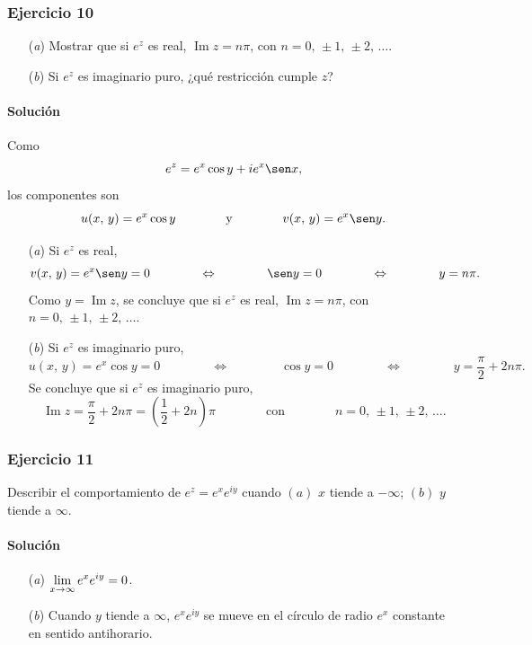 \documentclass[a4paper]{report}
\renewcommand{\Im}{\operatorname{Im}}
\begin{document}
\subsubsection{Ejercicio 10}

\begin{enumerate}
 \item[(\textit{a})] Mostrar que si \(e^z\) es real, \(\Im z=n\pi\), con \(n=0,\,\pm1,\,\pm2,\,\dots\).
 \item[(\textit{b})] Si \(e^z\) es imaginario puro, ¿qué restricción cumple \(z\)?
\end{enumerate}

\paragraph{Solución} Como
\[
 e^{z}=e^x\cos y+ie^x\sen x,
\]
los componentes son
\[
 u(x,\,y)=e^x\cos y
 \qquad\qquad\textrm{y}\qquad\qquad
 v(x,\,y)=e^x\sen y.
\]
\begin{enumerate}
 \item[(\textit{a})] Si \(e^z\) es real,
 \[
  v(x,\,y)=e^x\sen y=0
  \qquad\qquad\Leftrightarrow\qquad\qquad
  \sen y=0
  \qquad\qquad\Leftrightarrow\qquad\qquad
  y=n\pi.
 \]
 Como \(y=\Im z\), se concluye que si \(e^z\) es real, \(\Im z=n\pi\), con \(n=0,\,\pm1,\,\pm2,\,\dots\).
 \item[(\textit{b})] Si \(e^z\) es imaginario puro,
  \[
  u(x,\,y)=e^x\cos y=0
  \qquad\qquad\Leftrightarrow\qquad\qquad
  \cos y=0
  \qquad\qquad\Leftrightarrow\qquad\qquad
  y=\frac{\pi}{2}+2n\pi.
 \]
 Se concluye que si \(e^z\) es imaginario puro,
 \[
  \Im z=\frac{\pi}{2}+2n\pi=\left(\frac{1}{2}+2n\right)\pi
  \qquad\qquad\textrm{con}\qquad\qquad
  n=0,\,\pm1,\,\pm2,\,\dots.
 \]
\end{enumerate}

\subsubsection{Ejercicio 11}

Describir el comportamiento de \(e^z=e^xe^{iy}\) cuando \((a)\) \(x\) tiende a \(-\infty\); \((b)\) \(y\) tiende a \(\infty\).

\paragraph{Solución}

\begin{enumerate}
 \item[(\textit{a})] \(\displaystyle\lim_{x\to\-\infty}e^xe^{iy}=0\).
 \item[(\textit{b})] Cuando \(y\) tiende a \(\infty\), \(e^xe^{iy}\) se mueve en el círculo de radio \(e^x\) constante en sentido antihorario.
\end{enumerate}
\end{document}
